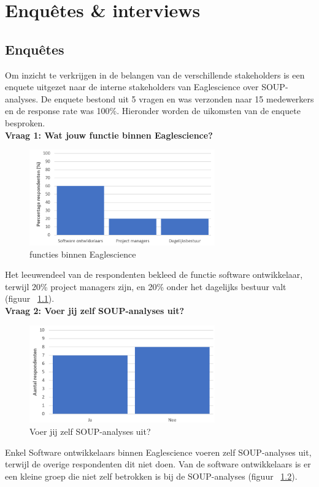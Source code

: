 
\chapter{Enquêtes \& interviews}\label{ch:Enquetes-interviews}
\section{Enquêtes}\label{sec:enquetes}

Om inzicht te verkrijgen in de belangen van de verschillende stakeholders is een enquete uitgezet naar de interne stakeholders van Eaglescience over SOUP-analyses. De enquete bestond uit 5 vragen en was verzonden naar 15 medewerkers en de response rate was 100\%. Hieronder worden de uikomsten van de enquete besproken.\\

\textbf{Vraag 1: Wat jouw functie binnen Eaglescience?}\\
\begin{figure}[bth]
    \centering
    \includegraphics[width=8cm]{gfx/appendix/Vraag1}
    \caption{functies binnen Eaglescience}
    \label{fig:enqueteV1}
\end{figure}

Het leeuwendeel van de respondenten bekleed de functie software ontwikkelaar, terwijl 20\% project managers zijn, en 20\% onder het dagelijks bestuur valt (figuur ~\ref{fig:enqueteV1}).\\

\textbf{Vraag 2: Voer jij zelf SOUP-analyses uit?}\\
\begin{figure}[bth]
    \centering
    \includegraphics[width=8cm]{gfx/appendix/Vraag2}
    \caption{Voer jij zelf SOUP-analyses uit?}
    \label{fig:enqueteV2}
\end{figure}
Enkel Software ontwikkelaars binnen Eaglescience voeren zelf SOUP-analyses uit, terwijl de overige respondenten dit niet doen. Van de software ontwikkelaars is er een kleine groep die niet zelf betrokken is bij de SOUP-analyses (figuur ~\ref{fig:enqueteV2}).\\

